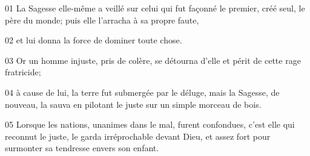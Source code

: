 01 La Sagesse elle-même a veillé sur celui qui fut façonné le premier, créé seul, le père du monde; puis elle l’arracha à sa propre faute,

02 et lui donna la force de dominer toute chose.

03 Or un homme injuste, pris de colère, se détourna d’elle et périt de cette rage fratricide;

04 à cause de lui, la terre fut submergée par le déluge, mais la Sagesse, de nouveau, la sauva en pilotant le juste sur un simple morceau de bois.

05 Lorsque les nations, unanimes dans le mal, furent confondues, c’est elle qui reconnut le juste, le garda irréprochable devant Dieu, et assez fort pour surmonter sa tendresse envers son enfant.